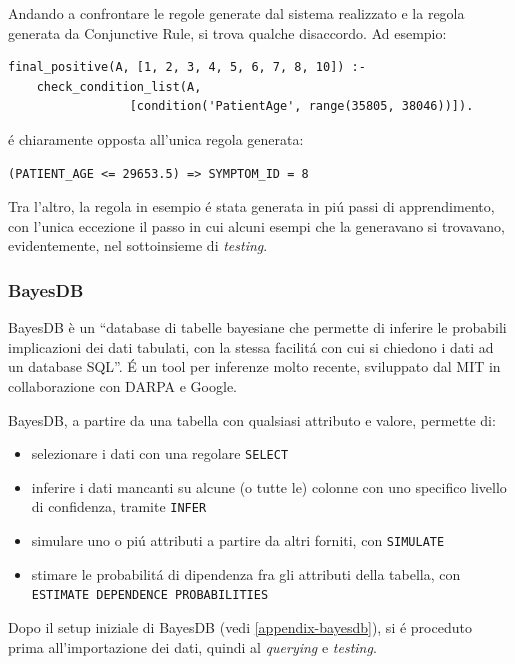 \documentclass[preprint]{acm_proc_article-sp}
\begin{document}
Andando a confrontare le regole generate dal sistema realizzato e la regola generata da Conjunctive Rule, si trova qualche disaccordo. Ad esempio:
\begin{verbatim}
final_positive(A, [1, 2, 3, 4, 5, 6, 7, 8, 10]) :-
	check_condition_list(A,
			     [condition('PatientAge', range(35805, 38046))]).
\end{verbatim}
\'e chiaramente opposta all'unica regola generata:
\begin{verbatim}
(PATIENT_AGE <= 29653.5) => SYMPTOM_ID = 8
\end{verbatim}

Tra l'altro, la regola in esempio \'e stata generata in pi\'u passi di apprendimento, con l'unica eccezione il passo in cui alcuni esempi che la generavano si trovavano, evidentemente, nel sottoinsieme di \textit{testing}.

\subsubsection{BayesDB}
BayesDB \cite{BayesDB:2014:Online} è un ``database di tabelle bayesiane che permette di inferire le probabili implicazioni dei dati tabulati, con la stessa facilit\'a con cui si chiedono i dati ad un database SQL''. \'E un tool per inferenze molto recente, sviluppato dal MIT in collaborazione con DARPA e Google.

BayesDB, a partire da una tabella con qualsiasi attributo e valore, permette di:
\begin{itemize}
\item selezionare i dati con una regolare \verb|SELECT|
\item inferire i dati mancanti su alcune (o tutte le) colonne con uno specifico livello di confidenza, tramite \verb|INFER|
\item simulare uno o pi\'u attributi a partire da altri forniti, con \verb|SIMULATE|
\item stimare le probabilit\'a di dipendenza fra gli attributi della tabella, con \verb|ESTIMATE DEPENDENCE PROBABILITIES|
\end{itemize}

Dopo il setup iniziale di BayesDB (vedi \ref{appendix-bayesdb}), si \'e proceduto prima all'importazione dei dati, quindi al \textit{querying} e \textit{testing}.
\end{document}
